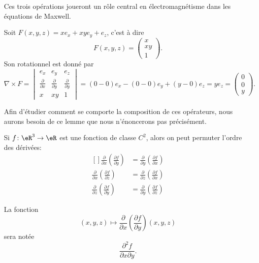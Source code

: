 Ces trois opérations joueront un rôle central en électromagnétisme dans les équations de Maxwell.

\begin{example}
    Soit $F(x,y,z)=x e_x+xy e_y+e_z$, c'est à dire
    \begin{equation}
        F(x,y,z)=\begin{pmatrix}
            x    \\ 
            xy    \\ 
            1    
        \end{pmatrix}.
    \end{equation}
    Son rotationnel est donné par
    \begin{equation}
        \nabla\times F=\begin{vmatrix}
            e_x    &   e_y    &   e_z    \\
            \frac{ \partial  }{ \partial x }    &   \frac{ \partial  }{ \partial y }    &   \frac{ \partial  }{ \partial y }    \\
            x    &   xy    &   1
        \end{vmatrix}=
        (0-0)e_x-(0-0)e_y+(y-0)e_z=ye_z=\begin{pmatrix}
            0    \\ 
            0    \\ 
            y    
        \end{pmatrix}.
    \end{equation}
\end{example}

Afin d'étudier comment se comporte la composition de ces opérateurs, nous aurons besoin de ce lemme que nous n'énoncerons pas précisément.
\begin{lemma}       \label{LemPermDerrxyz}
    Si $f\colon \eR^3\to \eR$ est une fonction de classe $C^2$, alors on peut permuter l'ordre des dérivées:
    \begin{equation}
        \begin{aligned}[]
            \frac{ \partial  }{ \partial x }\left( \frac{ \partial f }{ \partial y } \right)&=\frac{ \partial  }{ \partial y }\left( \frac{ \partial f }{ \partial x } \right)\\
            \frac{ \partial  }{ \partial x }\left( \frac{ \partial f }{ \partial z } \right)&=\frac{ \partial  }{ \partial z }\left( \frac{ \partial f }{ \partial x } \right)\\
            \frac{ \partial  }{ \partial z }\left( \frac{ \partial f }{ \partial y } \right)&=\frac{ \partial  }{ \partial y }\left( \frac{ \partial f }{ \partial z } \right)
        \end{aligned}
    \end{equation}
\end{lemma}
La fonction
\begin{equation}
    (x,y,z)\mapsto\frac{ \partial  }{ \partial x }\left( \frac{ \partial f }{ \partial y } \right)(x,y,z)
\end{equation}
sera notée
\begin{equation}
    \frac{ \partial^2f }{ \partial x\partial y }.
\end{equation}

